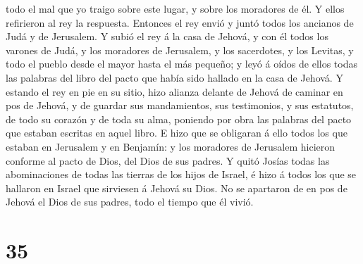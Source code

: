 todo el mal que yo traigo sobre este lugar, y sobre los moradores de él.
Y ellos refirieron al rey la respuesta.  Entonces el rey
envió y juntó todos los ancianos de Judá y de Jerusalem. 
Y subió el rey á la casa de Jehová, y con él todos los varones de Judá,
y los moradores de Jerusalem, y los sacerdotes, y los Levitas, y todo el
pueblo desde el mayor hasta el más pequeño; y leyó á oídos de ellos
todas las palabras del libro del pacto que había sido hallado en la casa
de Jehová.  Y estando el rey en pie en su sitio, hizo
alianza delante de Jehová de caminar en pos de Jehová, y de guardar sus
mandamientos, sus testimonios, y sus estatutos, de todo su corazón y de
toda su alma, poniendo por obra las palabras del pacto que estaban
escritas en aquel libro.  E hizo que se obligaran á ello
todos los que estaban en Jerusalem y en Benjamín: y los moradores de
Jerusalem hicieron conforme al pacto de Dios, del Dios de sus padres.
 Y quitó Josías todas las abominaciones de todas las
tierras de los hijos de Israel, é hizo á todos los que se hallaron en
Israel que sirviesen á Jehová su Dios. No se apartaron de en pos de
Jehová el Dios de sus padres, todo el tiempo que él vivió.

\hypertarget{section-34}{%
\section{35}\label{section-34}}

